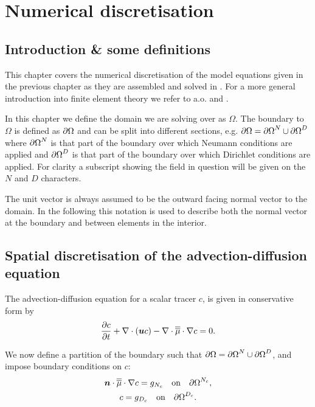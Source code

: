 \chapter{Numerical discretisation}\label{chap:numerical_discretisation}
\section{Introduction \& some definitions}\label{Sect:ND_Intro}
This chapter covers the numerical discretisation of the model equations
given in the previous chapter as they are assembled and solved 
in \fluidity. For a more general introduction into finite element theory
we refer to a.o. \cite{elman2005} and \cite{gresho1988}.

In this chapter we define the domain we are solving over as $\Omega$. The boundary to
$\Omega$ is defined as ${\partial\Omega}$
and can be split into different sections, e.g.
$\partial\Omega = {\partial\Omega}^{N}\cup {\partial\Omega}^{D}$
where ${\partial\Omega}^{N}$ is that part of the boundary over
which Neumann conditions are applied and ${\partial\Omega}^{D}$ is that part of the boundary over
which Dirichlet conditions are applied. For clarity a subscript showing the field in question will
be given on the $N$ and $D$ characters.

The unit vector  is always assumed to be the
outward facing normal vector to the domain.
In the following this notation is used to describe both the normal vector at the boundary
and between elements in the interior.

\section{Spatial discretisation of the advection-diffusion equation}
\label{Sect:ND_advection_diffusion_discretisation}

The advection-diffusion equation for a scalar tracer $c$,
is given in conservative form by
\begin{equation}\label{eq:advdif}
  \frac{\partial c}{\partial t} + \nabla\cdot\left({\mbox{\boldmath$u$}} c\right) - \nabla\cdot\overline{\overline{\mu}}\cdot\nabla c = 0.
\end{equation}

We now define a partition of the boundary such that
$\partial\Omega = {\partial\Omega}^{N}\cup {\partial\Omega}^{D}$, and impose boundary conditions on $c$:
\begin{gather}
  \label{eq:cboundary}
  {\mbox{\boldmath$n$}}\cdot\overline{\overline{\mu}}\cdot\nabla c=g_{N_c} \quad\textrm{on}\quad {\partial\Omega}^{N_c},\\
  c=g_{D_c} \quad\textrm{on}\quad {\partial\Omega}^{D_c}.
\end{gather}

